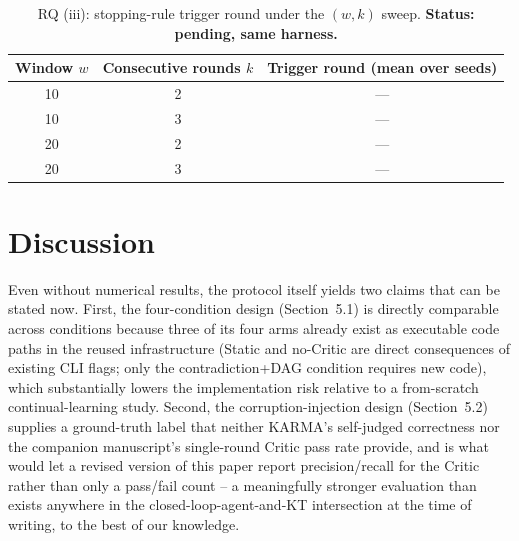 \documentclass[review,12pt]{elsarticle}
\begin{document}
\begin{table}[!t]
\caption{RQ (iii): stopping-rule trigger round under the $(w,k)$ sweep.
\textbf{Status: pending, same harness.}}
\label{tab:rq3-placeholder}
\centering
\small
\begin{tabular}{ccc}
\toprule
Window $w$ & Consecutive rounds $k$ & Trigger round (mean over seeds) \\
\midrule
10 & 2 & --- \\
10 & 3 & --- \\
20 & 2 & --- \\
20 & 3 & --- \\
\bottomrule
\end{tabular}
\end{table}

\section{Discussion}

Even without numerical results, the protocol itself yields two claims
that can be stated now. First, the four-condition design
(Section~5.1) is directly comparable across conditions because three of
its four arms already exist as executable code paths in the reused
infrastructure (Static and no-Critic are direct consequences of existing
CLI flags; only the contradiction+DAG condition requires new code), which
substantially lowers the implementation risk relative to a from-scratch
continual-learning study. Second, the corruption-injection design
(Section~5.2) supplies a ground-truth label that neither KARMA's
self-judged correctness nor the companion manuscript's single-round
Critic pass rate provide, and is what would let a revised version of this
paper report precision/recall for the Critic rather than only a pass/fail
count -- a meaningfully stronger evaluation than exists anywhere in the
closed-loop-agent-and-KT intersection at the time of writing, to the best
of our knowledge.
\end{document}
